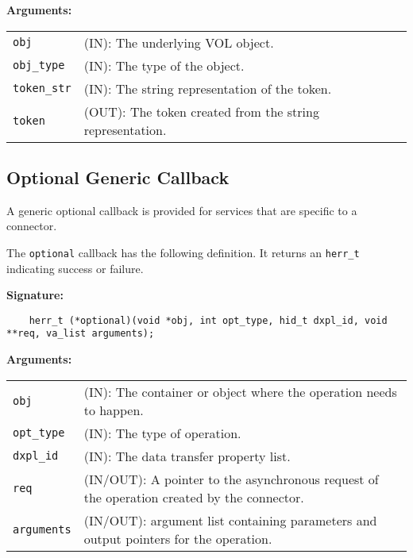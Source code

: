 \begin{mdframed}[style=bgbox]
\textbf{Arguments:}\\
\begin{tabular}{l p{13.5cm}}
  \texttt{obj} & (IN): The underlying VOL object.\\
  \texttt{obj\_type} & (IN): The type of the object.\\
  \texttt{token\_str} & (IN): The string representation of the token.\\
  \texttt{token} & (OUT): The token created from the string representation.\\
\end{tabular}
\end{mdframed}


\subsection{Optional Generic Callback}
A generic optional callback is provided for services that are specific to a connector.

The \texttt{optional} callback has the following definition. It returns an \texttt{herr\_t} indicating success or failure.\bigskip 

\begin{mdframed}[style=bgbox]
\textbf{Signature:}
\begin{lstlisting}
    herr_t (*optional)(void *obj, int opt_type, hid_t dxpl_id, void **req, va_list arguments);
\end{lstlisting}

\textbf{Arguments:}\\
\begin{tabular}{l p{13.5cm}}
  \texttt{obj} & (IN): The container or object where the operation needs to happen.\\
  \texttt{opt\_type} & (IN): The type of operation.\\
  \texttt{dxpl\_id} & (IN): The data transfer property list.\\
  \texttt{req} & (IN/OUT): A pointer to the asynchronous request of the operation created by the connector.\\
  \texttt{arguments} & (IN/OUT): argument list containing parameters and output pointers for the operation. \\
\end{tabular}
\end{mdframed}

